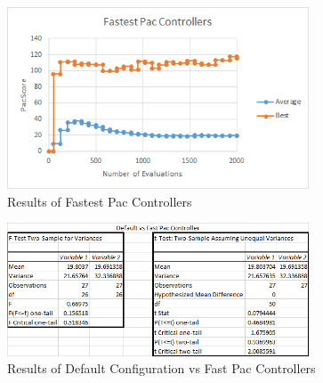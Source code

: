 \documentclass{article}
\begin{document}
\begin{flushleft}
\begin{figure}[h]
	\centering
	\includegraphics[width=0.8\textwidth]{speedFastest}
	\caption{Results of Fastest Pac Controllers}
\end{figure}

\clearpage

\begin{figure}[h]
	\centering
	\includegraphics[width=0.8\textwidth]{statDefaultVsFast}
	\caption{Results of Default Configuration vs Fast Pac Controllers}
\end{figure}
\end{flushleft}

\vspace{15mm}
\end{document}
